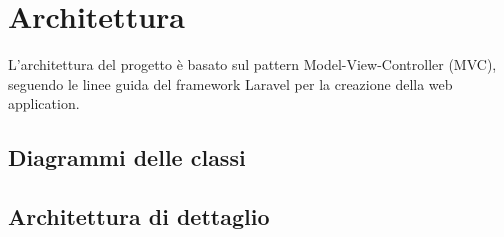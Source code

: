 \section{Architettura}
L'architettura del progetto è basato sul pattern Model-View-Controller (MVC), seguendo le linee guida del framework Laravel per la creazione della web application.


\subsection{Diagrammi delle classi}


\subsection{Architettura di dettaglio}
